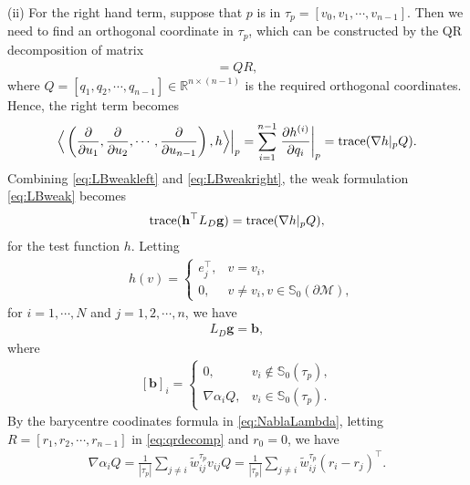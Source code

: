 \documentclass{article}
\begin{document}
(ii) For the right hand term, suppose that $p$ is in $\tau_p = [v_0,v_1,\cdots,v_{n-1}]$. Then we need to find an orthogonal coordinate in $\tau_p$, which can be constructed by the QR decomposition of matrix
\begin{align}
[v_{10}^\top,v_{20}^\top,\cdots,v_{(n-1)0}^\top] = QR, \label{eq:qrdecomp}
\end{align}
where $Q = [q_1,q_2,\cdots,q_{n-1}] \in \mathbb{R}^{n\times (n-1)}$ is the required orthogonal coordinates. Hence, the right term becomes
\begin{align} \label{eq:LBweakright}
    \Big\langle \left(\frac{\partial}{\partial u_1},\frac{\partial}{\partial u_2},\cdots,\frac{\partial}{\partial u_{n-1}}\right),h \Big\rangle\Big|_p = \sum_{i = 1}^{n-1} \left.\frac{\partial h^{(i)}}{\partial q_i}\right|_p =
    \mathrm{trace}(\nabla h|_p Q).
\end{align}
Combining \eqref{eq:LBweakleft} and \eqref{eq:LBweakright}, the weak formulation \eqref{eq:LBweak} becomes
\begin{align}
    \mathrm{trace}(\mathbf{h}^\top L_D\mathbf{g}) = \mathrm{trace}(\nabla h|_p Q),
\end{align}
for the test function $h$. Letting
\begin{align}
    &h(v) = \begin{cases}
        e_j^\top, & v = v_i,\\
        0, & v \neq v_i, v\in \mathbb{S}_0(\partial \mathcal{M}),
    \end{cases}
\end{align}
for $i = 1,\cdots,N$ and $j = 1,2,\cdots,n$, we have
\begin{align}
    L_D\mathbf{g} = \mathbf{b}, \label{eq:dirac_discrete}
\end{align}
where
\begin{align} \label{eq:b}
    [\mathbf{b}]_i = \begin{cases}
        0,& v_i \notin \mathbb{S}_0(\tau_p), \\
        \nabla \alpha_i Q, & v_i \in \mathbb{S}_0(\tau_p).
    \end{cases}
\end{align}
By the barycentre coodinates formula in \eqref{eq:NablaLambda}, letting $R = [r_1,r_2,\cdots,r_{n-1}]$ in \eqref{eq:qrdecomp} and $r_0 = 0$, we have
\begin{align} \label{eq:b_detail}
\nabla \alpha_i Q = \frac{1}{|\tau_p|}\sum_{j \neq i} \tilde{w}_{ij}^{\tau_p} v_{ij}Q =
\frac{1}{|\tau_p|} \sum_{j \neq i} \tilde{w}_{ij}^{\tau_p} (r_i - r_j)^\top.
\end{align}
\end{document}
